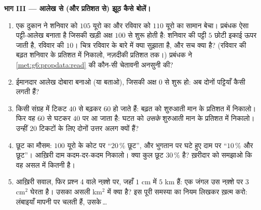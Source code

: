 \begin{problem}
\medskip
\noindent\textbf{भाग III --- आलेख से (और प्रतिशत से) झूठ कैसे
बोलें।}
\begin{enumerate}[resume]
  \item एक दुकान ने शनिवार को $105$ यूरो का और रविवार को $110$
        यूरो का सामान बेचा। प्रबंधक ऐसा पट्टी-आलेख बनाता है
        जिसकी खड़ी अक्ष $100$ से शुरू होती है: शनिवार की पट्टी
        $5$ छोटी इकाई ऊपर जाती है, रविवार की $10$। चित्र रविवार
        के बारे में क्या सुझाता है, और सच क्या है? (रविवार की
        बढ़त शनिवार के प्रतिशत में निकालो, नज़दीकी प्रतिशत तक।)
        प्रबंधक ने \cref{met:g6:propdata:read} की कौन-सी
        चेतावनी अनसुनी की?
  \item ईमानदार आलेख दोबारा बनाओ (या बताओ), जिसकी अक्ष $0$ से
        शुरू हो: अब दोनों पट्टियाँ कैसी लगती हैं?
  \item किसी संग्रह में टिकट $40$ से बढ़कर $60$ हो जाते हैं:
        बढ़त को शुरुआती मान के प्रतिशत में निकालो। फिर वह $60$
        से घटकर $40$ पर आ जाता है: घटत को \emph{उसके} शुरुआती
        मान के प्रतिशत में निकालो। उन्हीं $20$ टिकटों के लिए
        दोनों उत्तर अलग क्यों हैं?
  \item छूट का मौसम: $100$ यूरो के कोट पर ``$20\,\%$ छूट'', और
        भुगतान पर घटे हुए दाम पर ``$10\,\%$ और छूट''। आख़िरी दाम
        कदम-दर-कदम निकालो। क्या कुल छूट $30\,\%$ है? ख़रीदार को
        समझाओ कि वह असल में कितनी है।
  \item आख़िरी सवाल, फिर प्रश्न 4 वाले नक़्शे पर, जहाँ $1$ cm
        में $5$ km हैं: एक जंगल उस नक़्शे पर $3$ cm$^2$ घेरता है। उसका
        असली  km$^2$ में क्या है? इस पूरी समस्या का
        नियम लिखकर ख़त्म करो: लंबाइयाँ मापनी पर चलती हैं,
         उसके\,\dots
\end{enumerate}
\end{problem}

